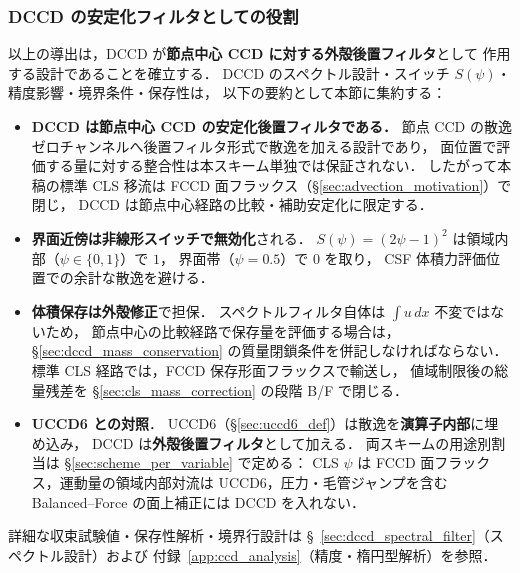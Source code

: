 \subsubsection{DCCD の安定化フィルタとしての役割}
\label{sec:dccd_role}

以上の導出は，DCCD が\textbf{節点中心 CCD に対する外殻後置フィルタ}として
作用する設計であることを確立する．
DCCD のスペクトル設計・スイッチ $S(\psi)$・精度影響・境界条件・保存性は，
以下の要約として本節に集約する：

\begin{itemize}
  \item \textbf{DCCD は節点中心 CCD の安定化後置フィルタである．}
        節点 CCD の散逸ゼロチャンネルへ後置フィルタ形式で散逸を加える設計であり，
        面位置で評価する量に対する整合性は本スキーム単独では保証されない．
        したがって本稿の標準 CLS 移流は FCCD 面フラックス（§\ref{sec:advection_motivation}）で閉じ，
        DCCD は節点中心経路の比較・補助安定化に限定する．
  \item \textbf{界面近傍は非線形スイッチで無効化}される．
        $S(\psi)=(2\psi-1)^2$ は領域内部（$\psi\in\{0,1\}$）で $1$，
        界面帯（$\psi=0.5$）で $0$ を取り，
        CSF 体積力評価位置での余計な散逸を避ける．
  \item \textbf{体積保存は外殻修正}で担保．
        スペクトルフィルタ自体は \(\int u\,dx\) 不変ではないため，
        節点中心の比較経路で保存量を評価する場合は，
        §\ref{sec:dccd_mass_conservation} の質量閉鎖条件を併記しなければならない．
        標準 CLS 経路では，FCCD 保存形面フラックスで輸送し，
        値域制限後の総量残差を §\ref{sec:cls_mass_correction} の段階 B/F で閉じる．
  \item \textbf{UCCD6 との対照}．
        UCCD6（§\ref{sec:uccd6_def}）は散逸を\textbf{演算子内部}に埋め込み，
        DCCD は\textbf{外殻後置フィルタ}として加える．
        両スキームの用途別割当は §\ref{sec:scheme_per_variable} で定める：
        CLS $\psi$ は FCCD 面フラックス，運動量の領域内部対流は UCCD6，圧力・毛管ジャンプを含む
        Balanced--Force の面上補正には DCCD を入れない．
\end{itemize}

\noindent
詳細な収束試験値・保存性解析・境界行設計は
§~\ref{sec:dccd_spectral_filter}（スペクトル設計）および
付録~\ref{app:ccd_analysis}（精度・楕円型解析）を参照．

